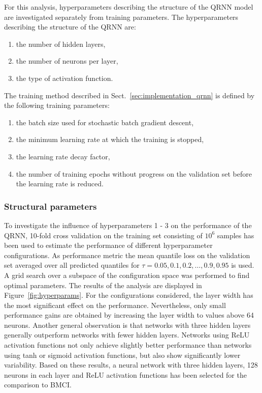 \documentclass[journal abbreviation, manuscript]{copernicus}
\begin{document}
For this analysis, hyperparameters describing the structure of the QRNN model
are investigated separately from training parameters. The hyperparameters
describing the structure of the QRNN are:
\begin{enumerate}
  \item the number of hidden layers,
  \item the number of neurons per layer,
  \item the type of activation function.
  \setcounter{enumic}{\value{enumi}}
\end{enumerate}
The training method  described in Sect.~\ref{sec:implementation_qrnn} is
defined by the following training parameters:
\begin{enumerate}
  \setcounter{enumi}{\value{enumic}}
  \item the batch size used for stochastic batch gradient descent,
  \item the minimum learning rate at which the training is stopped,
  \item the learning rate decay factor,
  \item the number of training epochs without progress on the validation set
     before the learning rate is reduced.
\end{enumerate}

\subsubsection{Structural parameters}

  To investigate the influence of hyperparameters 1 - 3 on the performance of
  the QRNN, 10-fold cross validation on the training set consisting of $10^6$
  samples has been used to estimate the performance of different hyperparameter
  configurations. As performance metric the mean quantile loss on the validation
  set averaged over all predicted quantiles for $\tau = 0.05, 0.1, 0.2, \ldots, 0.9, 0.95$ 
  is used. A grid search over a subspace of the configuration space was
  performed to find optimal parameters. The results of the analysis are
  displayed in Figure~\ref{fig:hyperparams}. For the configurations considered,
  the layer width has the most significant effect on the performance.
  Nevertheless, only small performance gains are obtained by increasing the
  layer width to values above 64 neurons. Another general observation is that
  networks with three hidden layers generally outperform networks with fewer hidden
  layers. Networks using ReLU activation functions not only achieve slightly
  better performance than networks using tanh or sigmoid activation functions,
  but also show significantly lower variability. Based on these results, a
  neural network with three hidden layers, 128 neurons in each layer and ReLU
  activation functions has been selected for the comparison to BMCI.
\end{document}
